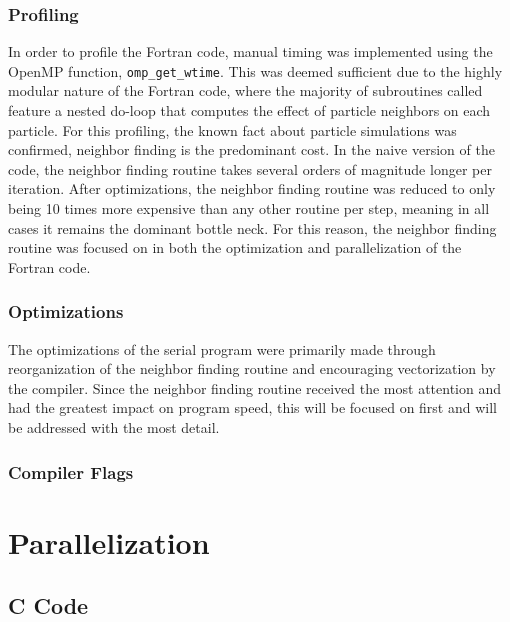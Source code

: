 \documentclass{scrartcl}
\begin{document}
  \subsubsection{Profiling}
  In order to profile the Fortran code, manual timing was implemented using the OpenMP function, \texttt{omp\_get\_wtime}. This was deemed sufficient due to the highly modular nature of the Fortran code, where the majority of subroutines called feature a nested do-loop that computes the effect of particle neighbors on each particle. For this profiling, the known fact about particle simulations was confirmed, neighbor finding is the predominant cost. In the naive version of the code, the neighbor finding routine takes several orders of magnitude longer per iteration. After optimizations, the neighbor finding routine was reduced to only being 10 times more expensive than any other routine per step, meaning in all cases it remains the dominant bottle neck. For this reason, the neighbor finding routine was focused on in both the optimization and parallelization of the Fortran code. 
  
  \subsubsection{Optimizations}
  The optimizations of the serial program were primarily made through reorganization of the neighbor finding routine and encouraging vectorization by the compiler. Since the neighbor finding routine received the most attention and had the greatest impact on program speed, this will be focused on first and will be addressed with the most detail.
  
  \subsubsection{Compiler Flags}
  
    \section{Parallelization}
    \subsection{C Code}  
\end{document}
